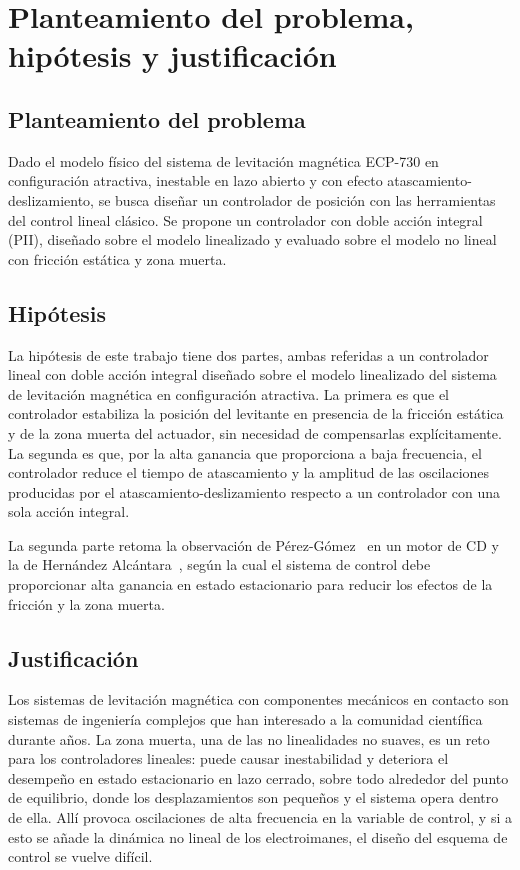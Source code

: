 \chapter{Planteamiento del problema, hipótesis y justificación}\label{chap:planteamiento}
\begin{sloppypar}

\section{Planteamiento del problema}

Dado el modelo físico del sistema de levitación magnética ECP-730 en configuración atractiva, inestable en lazo abierto y con efecto atascamiento-deslizamiento, se busca diseñar un controlador de posición con las herramientas del control lineal clásico. Se propone un controlador con doble acción integral (PII), diseñado sobre el modelo linealizado y evaluado sobre el modelo no lineal con fricción estática y zona muerta.

\section{Hipótesis}

La hipótesis de este trabajo tiene dos partes, ambas referidas a un controlador lineal con doble acción integral diseñado sobre el modelo linealizado del sistema de levitación magnética en configuración atractiva. La primera es que el controlador estabiliza la posición del levitante en presencia de la fricción estática y de la zona muerta del actuador, sin necesidad de compensarlas explícitamente. La segunda es que, por la alta ganancia que proporciona a baja frecuencia, el controlador reduce el tiempo de atascamiento y la amplitud de las oscilaciones producidas por el atascamiento-deslizamiento respecto a un controlador con una sola acción integral.

La segunda parte retoma la observación de Pérez-Gómez~\cite{perez} en un motor de CD y la de Hernández Alcántara~\cite{diana_tesis}, según la cual el sistema de control debe proporcionar alta ganancia en estado estacionario para reducir los efectos de la fricción y la zona muerta.

\section{Justificación}

Los sistemas de levitación magnética con componentes mecánicos en contacto son sistemas de ingeniería complejos que han interesado a la comunidad científica durante años. La zona muerta, una de las no linealidades no suaves, es un reto para los controladores lineales: puede causar inestabilidad y deteriora el desempeño en estado estacionario en lazo cerrado, sobre todo alrededor del punto de equilibrio, donde los desplazamientos son pequeños y el sistema opera dentro de ella. Allí provoca oscilaciones de alta frecuencia en la variable de control, y si a esto se añade la dinámica no lineal de los electroimanes, el diseño del esquema de control se vuelve difícil.


\end{sloppypar}
